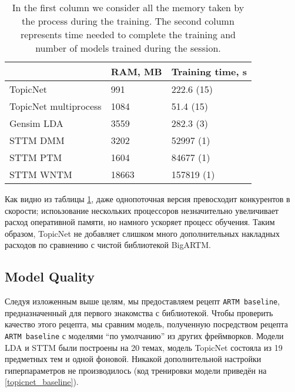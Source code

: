 \begin{table}[h]
\begin{tabular}{|l|l|l|}
\hline
                      & \multicolumn{1}{c|}{RAM, MB} & \multicolumn{1}{c|}{Training time, s} \\ \hline
TopicNet              & 991                         & 222.6 (15)                             \\ \hline
TopicNet multiprocess & 1084                        & 51.4 (15)                              \\ \hline
Gensim LDA            & 3559                        & 282.3 (3)                              \\ \hline
STTM DMM              & 3202                        & 52997 (1)                              \\ \hline
STTM PTM              & 1604                        & 84677 (1)                              \\ \hline
STTM WNTM             & 18663                       & 157819 (1)                             \\ \hline
\end{tabular}
\caption{In the first column we consider all the memory taken by the process during the training. The second column represents time needed to complete the training and number of models trained during the session.}
\label{performance-benchmark}
\end{table}

Как видно из таблицы \ref{performance-benchmark}, даже однопоточная версия превосходит конкурентов в скорости; испоьзование нескольких процессоров незначительно увеличивает расход оперативной памяти, но намного ускоряет процесс обучения. Таким образом, TopicNet не добавляет слишком много дополнительных накладных расходов по сравнению с чистой библиотекой BigARTM.

\subsection{Model Quality} 

Следуя изложенным выше целям, мы предоставляем рецепт \texttt{ARTM baseline}, предназначенный для первого знакомства с библиотекой. Чтобы проверить качество этого рецепта, мы сравним модель, полученную посредством рецепта \texttt{ARTM baseline} с моделями ``по умолчанию'' из других фреймворков. Модели LDA и STTM были построены на 20 темах, модель TopicNet состояла из 19 предметных тем и одной фоновой. Никакой дополнительной настройки гиперпараметров не производилось (код тренировки модели приведён на \ref{topicnet_baseline}). 

